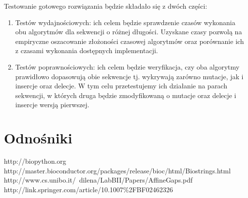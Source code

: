 \documentclass[a4paper,10pt]{article}
\begin{document}
	Testowanie gotowego rozwiązania będzie składało się z dwóch części:
	\begin{enumerate}
		\item Testów wydajnościowych: ich celem będzie sprawdzenie czasów wykonania obu algorytmów dla sekwencji o różnej długości. Uzyskane czasy pozwolą na empiryczne oszacowanie złożoności czasowej algorytmów oraz porównanie ich z czasami wykonania dostępnych implementacji.
		\item Testów poprawnościowych: ich celem będzie weryfikacja, czy oba algorytmy prawidłowo dopasowują obie sekwencje tj. wykrywają zarówno mutacje, jak i insercje oraz delecje. W tym celu przetestujemy ich działanie na parach sekwencji, w których druga będzie zmodyfikowaną o mutacje oraz delecje i insercje wersją pierwszej.
	\end{enumerate}

	\section{Odnośniki}

	\begin{thebibliography}{99}
		 http://biopython.org
		 http://master.bioconductor.org/packages/release/bioc/html/Biostrings.html
		 http://www.cs.unibo.it/~dilena/LabBII/Papers/AffineGaps.pdf
		 http://link.springer.com/article/10.1007\%2FBF02462326
	\end{thebibliography}
\end{document}
